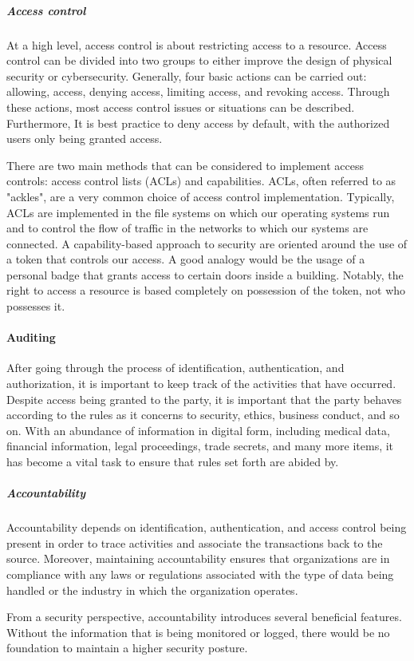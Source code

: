 \subparagraph{Access control}
At a high level, access control is about restricting access to a resource. Access control can be divided into two groups to either improve the design of physical security or cybersecurity. Generally, four basic actions can be carried out: allowing, access, denying access, limiting access, and revoking access. Through these actions, most access control issues or situations can be described. Furthermore, It is best practice to deny access by default, with the authorized users only being granted access.

There are two main methods that can be considered to implement access controls: access control lists (ACLs) and capabilities. ACLs, often referred to as "ackles", are a very common choice of access control implementation. Typically, ACLs are implemented in the file systems on which our operating systems run and to control the flow of traffic in the networks to which our systems are connected. A capability-based approach to security are oriented around the use of a token that controls our access. A good analogy would be the usage of a personal badge that grants access to certain doors inside a building. Notably, the right to access a resource is based completely on possession of the token, not who possesses it.

\paragraph{Auditing}
After going through the process of identification, authentication, and authorization, it is important to keep track of the activities that have occurred. Despite access being granted to the party, it is important that the party behaves according to the rules as it concerns to security, ethics, business conduct, and so on. With an abundance of information in digital form, including medical data, financial information, legal proceedings, trade secrets, and many more items, it has become a vital task to ensure that rules set forth are abided by.

\subparagraph{Accountability}
Accountability depends on identification, authentication, and access control being present in order to trace activities and associate the transactions back to the source. Moreover, maintaining accountability ensures that organizations are in compliance with any laws or regulations associated with the type of data being handled or the industry in which the organization operates. 

From a security perspective, accountability introduces several beneficial features. Without the information that is being monitored or logged, there would be no foundation to maintain a higher security posture.

